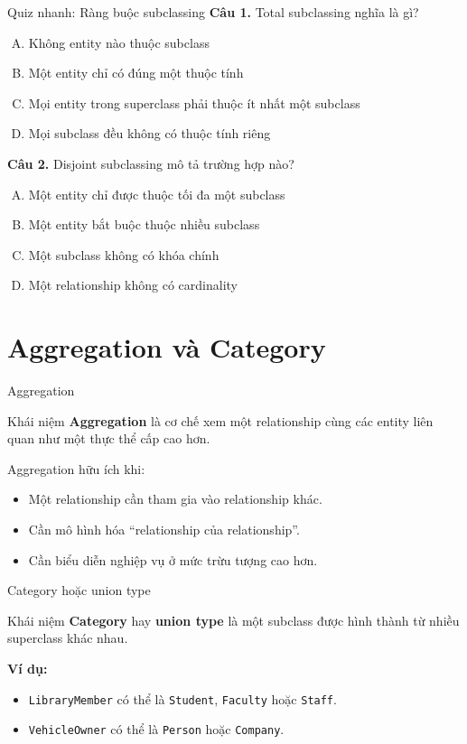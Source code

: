 \documentclass[aspectratio=169,11pt]{beamer}
\newcommand{\concept}[1]{\textcolor{NEUBlue}{\textbf{#1}}}
\newcommand{\codeword}[1]{\texttt{#1}}
\begin{document}
\begin{frame}{Quiz nhanh: Ràng buộc subclassing}
\textbf{Câu 1.} Total subclassing nghĩa là gì?
\begin{enumerate}[A.]
    \item Không entity nào thuộc subclass
    \item Một entity chỉ có đúng một thuộc tính
    \item Mọi entity trong superclass phải thuộc ít nhất một subclass
    \item Mọi subclass đều không có thuộc tính riêng
\end{enumerate}
\vspace{0.2cm}
\textbf{Câu 2.} Disjoint subclassing mô tả trường hợp nào?
\begin{enumerate}[A.]
    \item Một entity chỉ được thuộc tối đa một subclass
    \item Một entity bắt buộc thuộc nhiều subclass
    \item Một subclass không có khóa chính
    \item Một relationship không có cardinality
\end{enumerate}
\end{frame}

\section{Aggregation và Category}

\begin{frame}{Aggregation}
\begin{block}{Khái niệm}
\concept{Aggregation} là cơ chế xem một relationship cùng các entity liên quan như một thực thể cấp cao hơn.
\end{block}

Aggregation hữu ích khi:
\begin{itemize}
    \item Một relationship cần tham gia vào relationship khác.
    \item Cần mô hình hóa ``relationship của relationship''.
    \item Cần biểu diễn nghiệp vụ ở mức trừu tượng cao hơn.
\end{itemize}
\end{frame}

\begin{frame}{Category hoặc union type}
\begin{block}{Khái niệm}
\concept{Category} hay \concept{union type} là một subclass được hình thành từ nhiều superclass khác nhau.
\end{block}

\textbf{Ví dụ:}
\begin{itemize}
    \item \codeword{LibraryMember} có thể là \codeword{Student}, \codeword{Faculty} hoặc \codeword{Staff}.
    \item \codeword{VehicleOwner} có thể là \codeword{Person} hoặc \codeword{Company}.
\end{itemize}
\end{frame}
\end{document}
